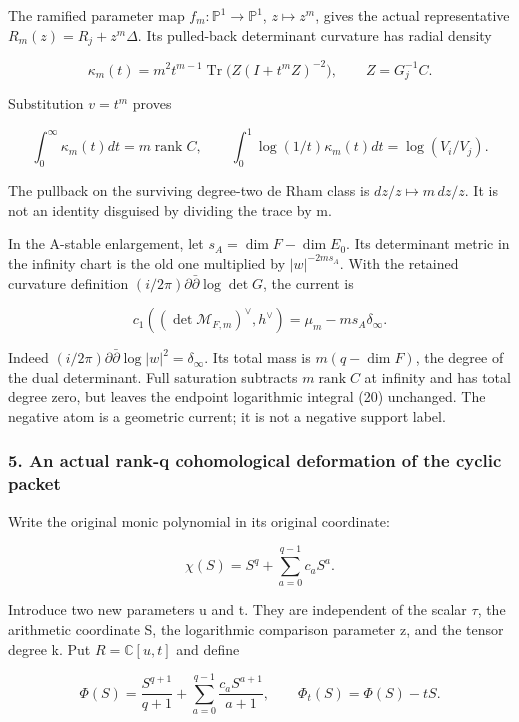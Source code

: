The ramified parameter map \(f_m:\mathbb P^1\to\mathbb P^1\), \(z\mapsto z^m\), gives the actual representative \(R_m(z)=R_j+z^m\Delta\). Its pulled-back determinant curvature has radial density

\[
\kappa_m(t)=m^2t^{m-1}\operatorname{Tr}\bigl(Z(I+t^mZ)^{-2}\bigr),
\qquad Z=G_j^{-1}C.
\tag{19}
\]

Substitution \(v=t^m\) proves

\[
\boxed{\int_0^\infty\kappa_m(t)dt=m\operatorname{rank}C,\qquad
\int_0^1\log(1/t)\kappa_m(t)dt=\log(V_i/V_j).}
\tag{20}
\]

The pullback on the surviving degree-two de Rham class is \(dz/z\mapsto m\,dz/z\). It is not an identity disguised by dividing the trace by m.

In the A-stable enlargement, let \(s_A=\dim F-\dim E_0\). Its determinant metric in the infinity chart is the old one multiplied by \(|w|^{-2ms_A}\). With the retained curvature definition \((i/2\pi)\partial\bar\partial\log\det G\), the current is

\[
\boxed{c_1((\det\mathcal M_{F,m})^\vee,h^\vee)
=\mu_m-ms_A\delta_\infty.}
\tag{21}
\]

Indeed \((i/2\pi)\partial\bar\partial\log|w|^2=\delta_\infty\). Its total mass is \(m(q-\dim F)\), the degree of the dual determinant. Full saturation subtracts \(m\operatorname{rank}C\) at infinity and has total degree zero, but leaves the endpoint logarithmic integral (20) unchanged. The negative atom is a geometric current; it is not a negative support label.

\subsubsection{5. An actual rank-q cohomological deformation of the cyclic packet}\label{endpoint-exponential_original--an-actual-rank-q-cohomological-deformation-of-the-cyclic-packet}

Write the original monic polynomial in its original coordinate:

\[
\chi(S)=S^q+\sum_{a=0}^{q-1}c_aS^a.
\tag{22}
\]

Introduce two new parameters u and t. They are independent of the scalar \(\tau\), the arithmetic coordinate S, the logarithmic comparison parameter z, and the tensor degree k. Put \(R=\mathbb C[u,t]\) and define

\[
\Phi(S)=\frac{S^{q+1}}{q+1}+\sum_{a=0}^{q-1}\frac{c_aS^{a+1}}{a+1},
\qquad\Phi_t(S)=\Phi(S)-tS.
\tag{23}
\]

